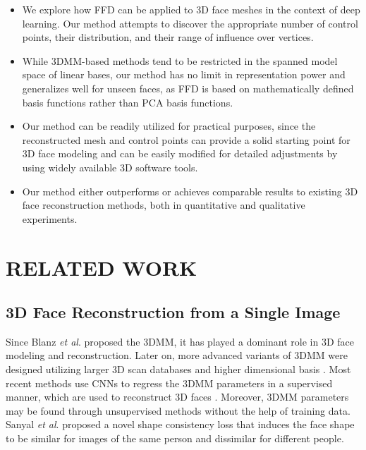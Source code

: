 \documentclass[letterpaper, 10 pt, conference]{ieeeconf}
\begin{document}
\begin{itemize}
\item 
We explore how FFD can be applied to 3D face meshes in the context of deep learning. Our method attempts to discover the appropriate number of control points, their distribution, and their range of influence over vertices.

\item 
While 3DMM-based methods tend to be restricted in the spanned model space of linear bases, our method has no limit in representation power and generalizes well for unseen faces, as FFD is based on mathematically defined basis functions rather than PCA basis functions.

\item 
Our method can be readily utilized for practical purposes, since the reconstructed mesh and control points can provide a solid starting point for 3D face modeling and can be easily modified for detailed adjustments by using widely available 3D software tools.

\item 
Our method either outperforms or achieves comparable results to existing 3D face reconstruction methods, both in quantitative and qualitative experiments.

\end{itemize}


\section{RELATED WORK}
\subsection{3D Face Reconstruction from a Single Image}
Since Blanz \emph{et al}. \cite{blanz1999morphable} proposed the 3DMM, it has played a dominant role in 3D face modeling and reconstruction. Later on, more advanced variants of 3DMM were designed utilizing larger 3D scan databases and higher dimensional basis \cite{cao2013facewarehouse, paysan20093d, booth20163d, shin2012morphable}. 
Most recent methods use CNNs to regress the 3DMM parameters in a supervised manner, which are used to reconstruct 3D faces \cite{zhu2016face, guo2020towards, liu2017dense}.
Moreover, 3DMM parameters may be found through unsupervised methods \cite{sanyal2019learning, tewari2017mofa} without the help of training data. Sanyal \emph{et al}. \cite{sanyal2019learning} proposed a novel shape consistency loss that induces the face shape to be similar for images of the same person and dissimilar for different people. 
\end{document}
